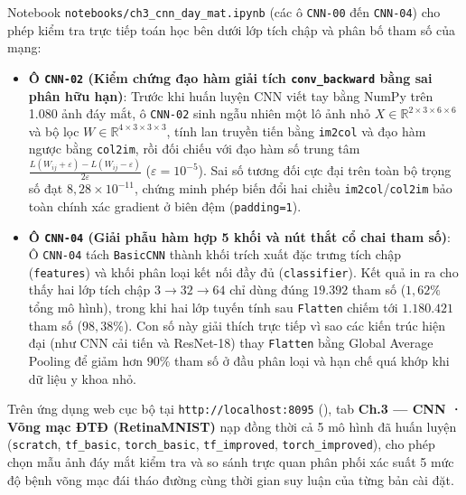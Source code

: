 Notebook \texttt{notebooks/ch3\_cnn\_day\_mat.ipynb} (các ô \texttt{CNN-00} đến \texttt{CNN-04}) cho phép kiểm tra trực tiếp toán học bên dưới lớp tích chập và phân bố tham số của mạng:
\begin{itemize}
  \item \textbf{Ô \texttt{CNN-02} (Kiểm chứng đạo hàm giải tích \texttt{conv\_backward} bằng sai phân hữu hạn)}: Trước khi huấn luyện CNN viết tay bằng NumPy trên 1.080 ảnh đáy mắt, ô \texttt{CNN-02} sinh ngẫu nhiên một lô ảnh nhỏ $X\in\mathbb R^{2\times 3\times 6\times 6}$ và bộ lọc $W\in\mathbb R^{4\times 3\times 3\times 3}$, tính lan truyền tiến bằng \texttt{im2col} và đạo hàm ngược bằng \texttt{col2im}, rồi đối chiếu với đạo hàm số trung tâm $\frac{L(W_{ij}+\varepsilon)-L(W_{ij}-\varepsilon)}{2\varepsilon}$ ($\varepsilon=10^{-5}$). Sai số tương đối cực đại trên toàn bộ trọng số đạt $8{,}28\times 10^{-11}$, chứng minh phép biến đổi hai chiều \texttt{im2col}/\texttt{col2im} bảo toàn chính xác gradient ở biên đệm (\texttt{padding=1}).
  \item \textbf{Ô \texttt{CNN-04} (Giải phẫu hàm hợp 5 khối và nút thắt cổ chai tham số)}: Ô \texttt{CNN-04} tách \texttt{BasicCNN} thành khối trích xuất đặc trưng tích chập (\texttt{features}) và khối phân loại kết nối đầy đủ (\texttt{classifier}). Kết quả in ra cho thấy hai lớp tích chập $3\to 32\to 64$ chỉ dùng đúng $19.392$ tham số ($1{,}62\%$ tổng mô hình), trong khi hai lớp tuyến tính sau \texttt{Flatten} chiếm tới $1.180.421$ tham số ($98{,}38\%$). Con số này giải thích trực tiếp vì sao các kiến trúc hiện đại (như CNN cải tiến và ResNet-18) thay \texttt{Flatten} bằng Global Average Pooling để giảm hơn $90\%$ tham số ở đầu phân loại và hạn chế quá khớp khi dữ liệu y khoa nhỏ.
\end{itemize}

Trên ứng dụng web cục bộ tại \texttt{http://localhost:8095} (), tab \textbf{Ch.3 — CNN · Võng mạc ĐTĐ (RetinaMNIST)} nạp đồng thời cả 5 mô hình đã huấn luyện (\texttt{scratch}, \texttt{tf\_basic}, \texttt{torch\_basic}, \texttt{tf\_improved}, \texttt{torch\_improved}), cho phép chọn mẫu ảnh đáy mắt kiểm tra và so sánh trực quan phân phối xác suất 5 mức độ bệnh võng mạc đái tháo đường cùng thời gian suy luận của từng bản cài đặt.


